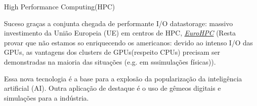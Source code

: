 \documentclass{beamer}
\begin{document}
\begin{frame}{High Performance Computing(HPC)}
		\vspace{0.3cm}
		
		Suceso graças a  conjunta  chegada de performante  I/O  datastorage:  massivo investimento da União Europeia (UE) em centros de HPC, \textcolor{blue}{\emph{\href{https://eurohpc-ju.europa.eu/index_en}{EuroHPC}}}
		(Resta provar que não estamos so enriquecendo os americanos: devido ao intenso I/O das GPUs, as vantagens dos clusters de GPUs(respeito CPUs) precisam ser demonstradas na maioria das situações (e.g. em sssimulações físicas)).
		
		\vspace{0.3cm}
		Essa nova tecnologia é a base para a explosão da popularização da inteligência artificial (AI). Outra aplicação de destaque é o uso de gêmeos digitais e simulações para a indústria.
		

	\end{frame}
	
\end{document}
